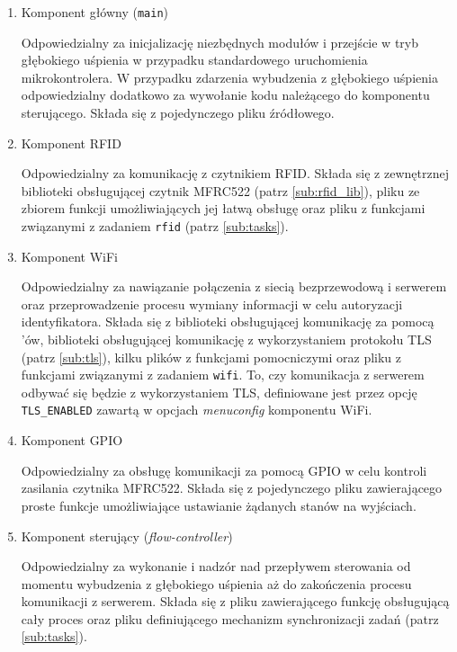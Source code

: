             \begin{enumerate}
                \item Komponent główny (\texttt{main})

                    Odpowiedzialny za inicjalizację niezbędnych modułów i przejście w tryb głębokiego uśpienia w przypadku standardowego uruchomienia mikrokontrolera. W przypadku zdarzenia wybudzenia z głębokiego uśpienia odpowiedzialny dodatkowo za wywołanie kodu należącego do komponentu sterującego. Składa się z pojedynczego pliku źródłowego.

                \item Komponent RFID

                    Odpowiedzialny za komunikację z czytnikiem RFID. Składa się z zewnętrznej biblioteki obsługującej czytnik MFRC522 (patrz \ref{sub:rfid_lib}), pliku ze zbiorem funkcji umożliwiających jej łatwą obsługę oraz pliku z funkcjami związanymi z zadaniem \texttt{rfid} (patrz \ref{sub:tasks}).

                \item Komponent WiFi

                    Odpowiedzialny za nawiązanie połączenia z siecią bezprzewodową i serwerem oraz przeprowadzenie procesu wymiany informacji w celu autoryzacji identyfikatora. Składa się z biblioteki obsługującej komunikację za pomocą \socket'ów, biblioteki obsługującej komunikację z wykorzystaniem protokołu TLS (patrz \ref{sub:tls}), kilku plików z funkcjami pomocniczymi oraz pliku z funkcjami związanymi z zadaniem \texttt{wifi}. To, czy komunikacja z serwerem odbywać się będzie z wykorzystaniem TLS, definiowane jest przez opcję \texttt{TLS\_ENABLED} zawartą w opcjach \textit{menuconfig} komponentu WiFi.

                \item Komponent GPIO

                    Odpowiedzialny za obsługę komunikacji za pomocą GPIO w celu kontroli zasilania czytnika MFRC522. Składa się z pojedynczego pliku zawierającego proste funkcje umożliwiające ustawianie żądanych stanów na wyjściach.

                \item Komponent sterujący (\textit{flow-controller})

                    Odpowiedzialny za wykonanie i nadzór nad przepływem sterowania od momentu wybudzenia z głębokiego uśpienia aż do zakończenia procesu komunikacji z serwerem. Składa się z pliku zawierającego funkcję obsługującą cały proces oraz pliku definiującego mechanizm synchronizacji zadań (patrz \ref{sub:tasks}).

            \end{enumerate}


